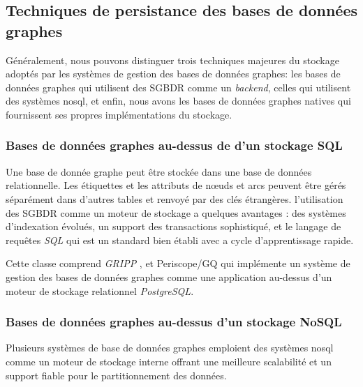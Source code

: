   \subsection{Techniques de persistance des bases de données graphes}
  \label{sec:persistence}
  Généralement, nous pouvons distinguer trois techniques majeures du
  stockage adoptés par les systèmes de gestion des bases de données
  graphes: les bases de données graphes qui utilisent des
  \acrshort{SGBDR} comme un \emph{backend}, celles qui utilisent des
  systèmes \acrshort{nosql}, et enfin, nous avons les bases de données
  graphes natives qui fournissent ses propres implémentations du
  stockage.

    \subsubsection{Bases de données graphes au-dessus de d'un stockage
      SQL}
    \label{sec:graphdb-over-sql}
    Une base de donnée graphe peut être stockée dans une base de
    données relationnelle. Les étiquettes et les attributs de nœuds et
    arcs peuvent être gérés séparément dans d'autres tables et renvoyé
    par des clés étrangères. l'utilisation des \acrshort{SGBDR} comme
    un moteur de stockage a quelques avantages : des systèmes
    d'indexation évolués, un support des transactions sophistiqué, et
    le langage de requêtes \emph{SQL} qui est un standard bien établi
    avec a cycle d'apprentissage rapide.\medskip

    

    Cette classe comprend \emph{GRIPP} \cite{trissl2007fast}, et
    Periscope/GQ \cite{tian2008periscope} qui implémente un système de
    gestion des bases de données graphes comme une application
    au-dessus d'un moteur de stockage relationnel \emph{PostgreSQL}.


    \subsubsection{Bases de données graphes au-dessus d'un stockage
      NoSQL}
    \label{sec:graphdb-over-nosql}
    Plusieurs systèmes de base de données graphes emploient des
    systèmes \acrshort{nosql} comme un moteur de stockage interne
    offrant une meilleure scalabilité et un support fiable pour le
    partitionnement des données.\bigskip

